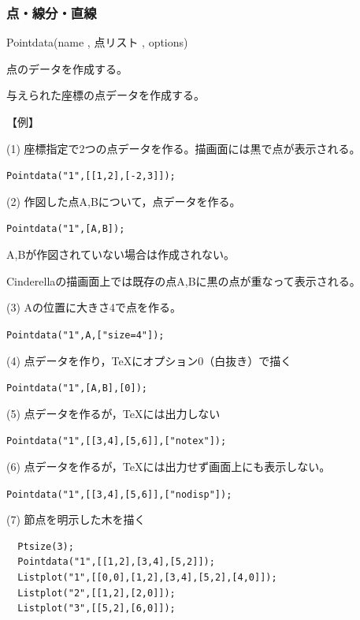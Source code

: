 \documentclass[papersize,a4paper,12pt,uplatex]{jsarticle}
\begin{document}
\subsubsection{点・線分・直線}
\begin{description}

\vspace{\baselineskip}
\hypertarget{pointdata}{}
\item[関数]  Pointdata(name , 点リスト , options)
\item[機能]  点のデータを作成する。
\item[説明]  与えられた座標の点データを作成する。

\vspace{\baselineskip}
【例】

(1) 座標指定で2つの点データを作る。描画面には黒で点が表示される。

\hspace{10mm} \verb|Pointdata("1",[[1,2],[-2,3]]);|

(2) 作図した点A,Bについて，点データを作る。

\hspace{10mm} \verb|Pointdata("1",[A,B]);|
      
\hspace{5mm}A,Bが作図されていない場合は作成されない。

\hspace{5mm}Cinderellaの描画面上では既存の点A,Bに黒の点が重なって表示される。

(3) Aの位置に大きさ4で点を作る。

\hspace{10mm} \verb|Pointdata("1",A,["size=4"]);|
      
(4) 点データを作り，TeXにオプション0（白抜き）で描く

\hspace{10mm}  \verb|Pointdata("1",[A,B],[0]);|
      
(5) 点データを作るが，TeXには出力しない

\hspace{10mm}  \verb|Pointdata("1",[[3,4],[5,6]],["notex"]);|

(6)  点データを作るが，TeXには出力せず画面上にも表示しない。
        
\hspace{10mm} \verb|Pointdata("1",[[3,4],[5,6]],["nodisp"]);|

(7) 節点を明示した木を描く
\begin{verbatim}
  Ptsize(3); 
  Pointdata("1",[[1,2],[3,4],[5,2]]); 
  Listplot("1",[[0,0],[1,2],[3,4],[5,2],[4,0]]); 
  Listplot("2",[[1,2],[2,0]]); 
  Listplot("3",[[5,2],[6,0]]);
\end{verbatim}
 

\end{description}
\end{document}
